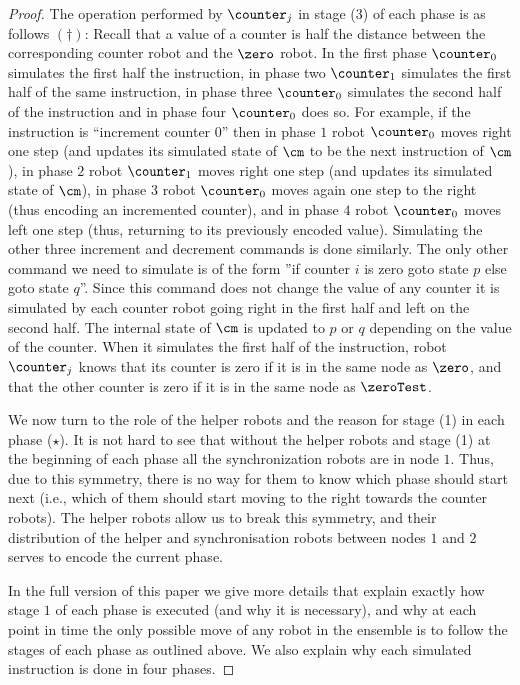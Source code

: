 \begin{proof}
The operation performed by $\counter_j$ in stage (3) of each phase is as follows $(\dagger)$:
Recall that a value of a counter is half the distance between the corresponding counter robot and the $\zero$ robot.
In the first phase $\counter_0$ simulates the first half the instruction, in phase two $\counter_1$ simulates the first half of the same instruction, in phase three $\counter_0$ simulates the second half of the instruction and in phase four $\counter_0$ does so. For example, if the instruction is ``increment counter $0$'' then in phase $1$ robot $\counter_0$ moves right one step (and updates its simulated state of $\cm$ to be the next instruction of $\cm$), in phase $2$ robot $\counter_1$ moves right one step (and updates its simulated state of $\cm$), in phase $3$ robot $\counter_0$ moves again one step to the right (thus encoding an incremented counter), and in phase $4$ robot $\counter_0$ moves left one step (thus, returning to its previously encoded value). Simulating the other three increment and decrement commands is done similarly. The only other command we need to simulate is of the form ''if counter $i$ is zero goto state $p$ else goto state $q$''. Since this command does not change the value of any counter it is simulated by each counter robot going right in the first half and left on the second half. The internal state of $\cm$ is updated to $p$ or $q$ depending on the value of the counter. When it simulates the first half of the instruction, robot $\counter_j$ knows that its counter is zero if it is in the same node as $\zero$, and that the other counter is zero if it is in the same node as $\zeroTest$.

We now turn to the role of the helper robots and the reason for stage (1) in
each phase ($\star$). It is not hard to see that without the helper robots and stage (1)
at the beginning of each phase all the synchronization robots are in node $1$.
Thus, due to this symmetry, there is no way for them to know which phase should
start next (i.e., which of them should start moving to the right towards the counter robots). 
The helper robots allow us to break this symmetry, and their
distribution of the helper and synchronisation robots between nodes $1$ and $2$ serves to encode the current phase.

In the full version of this paper we give more details that explain exactly how stage $1$ of each phase is executed (and why it is necessary), and why at each point in time the only possible move of any robot in the ensemble is to follow the stages of each phase as outlined above. We also explain why each simulated instruction is done in four phases.
\end{proof}


